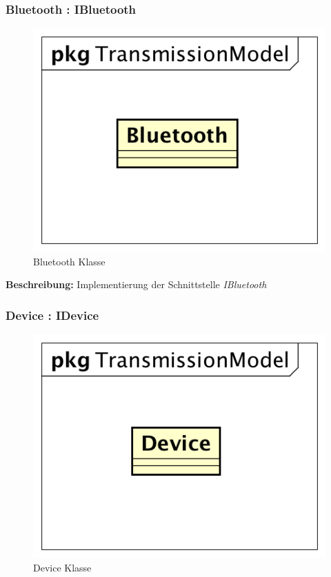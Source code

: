 \documentclass[a4paper]{scrreprt}
\begin{document}
\subsubsection{Bluetooth : IBluetooth}
\begin{figure}[H]
\centering
\includegraphics[width=0.45\textheight]{graphics/Klassendiagramme/Model/Bluetooth.png}
\caption{Bluetooth Klasse}
\end{figure}

\textbf{Beschreibung:} Implementierung der Schnittstelle \textit{IBluetooth}


\subsubsection{Device : IDevice}
\begin{figure}[H]
\centering
\includegraphics[width=0.45\textheight]{graphics/Klassendiagramme/Model/Device.png}
\caption{Device Klasse}
\end{figure}
\end{document}
